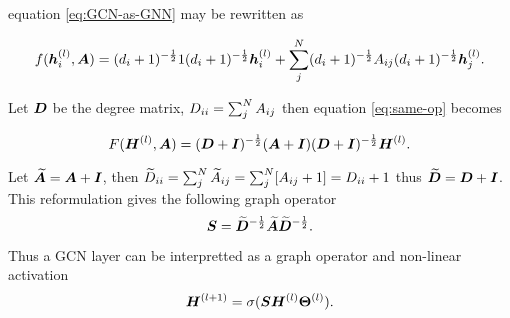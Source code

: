 
equation \ref{eq:GCN-as-GNN} may be rewritten as

\begin{equation}
    \label{eq:same-op}
    f({\bm{h}}_i^{(l)}, {\bm{A}}) = (d_i + 1)^{-\frac12}1(d_i + 1)^{-\frac12}{\bm{h}}_i^{(l)} + \sum_j^N(d_i + 1)^{-\frac12}{A}_{ij}(d_i + 1)^{-\frac12}{\bm{h}}_j^{(l)}.
\end{equation}

Let ${\bm{D}}$ be the degree matrix, ${D}_{ii} = \sum_j^N {A}_{ij}$ then
equation \ref{eq:same-op} becomes

\begin{equation}
    F({\bm{H}}^{(l)}, {\bm{A}}) = ({\bm{D}} + {\bm{I}})^{-\frac12}({\bm{A}} + {\bm{I}})({\bm{D}} + {\bm{I}})^{-\frac12}{\bm{H}}^{(l)}.
\end{equation}

Let $\widetilde{{\bm{A}}} = {\bm{A}} + {\bm{I}}$, then $\widetilde{{D}}_{ii} = \sum_j^N \widetilde{{A}}_{ij} = \sum_j^N [{A}_{ij} + 1] = {D}_{ii} + 1$ thus $\widetilde{{\bm{D}}} = {\bm{D}} + {\bm{I}}$.
This reformulation gives the following graph operator 
\begin{equation}
    \label{eq:op}
    {\bm{S}} = \widetilde{{\bm{D}}}^{-\frac12}\widetilde{{\bm{A}}}\widetilde{{\bm{D}}}^{-\frac12}.
\end{equation}

Thus a GCN layer can be interpretted as a graph operator and non-linear activation
\begin{equation}
    \label{eq:GCN1}
    {\bm{H}}^{(l+1)} = \sigma({\bm{S}}{\bm{H}}^{(l)}\bm{\Theta}^{(l)}).
\end{equation}


